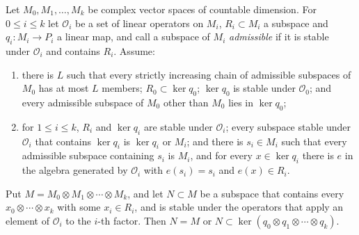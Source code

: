 \begin{lemma}\label{th-howe-tensor}
Let $M_0,M_1,\ldots,M_k$ be complex vector spaces of countable dimension. For
$0\leq i\leq k$ let $\mathcal O_i$ be a set of linear operators on $M_i$,
$R_i\subset M_i$ a subspace and $q_i\colon M_i\to P_i$ a linear map, and call
a subspace of $M_i$ \emph{admissible} if it is stable under $\mathcal O_i$ and
contains $R_i$. Assume:
\begin{enumerate}
\item[(a)] there is $L$ such that every strictly increasing chain of
  admissible subspaces of $M_0$ has at most $L$ members; $R_0\subset\ker q_0$;
  $\ker q_0$ is stable under $\mathcal O_0$; and every admissible subspace of
  $M_0$ other than $M_0$ lies in $\ker q_0$;
\item[(b)] for $1\leq i\leq k$, $R_i$ and $\ker q_i$ are stable under
  $\mathcal O_i$; every subspace stable under $\mathcal O_i$ that contains
  $\ker q_i$ is $\ker q_i$ or $M_i$; and there is $s_i\in M_i$ such that every
  admissible subspace containing $s_i$ is $M_i$, and for every
  $x\in\ker q_i$ there is $e$ in the algebra generated by $\mathcal O_i$ with
  $e(s_i)=s_i$ and $e(x)\in R_i$.
\end{enumerate}
Put $M=M_0\otimes M_1\otimes\cdots\otimes M_k$, and let $N\subset M$ be a
subspace that contains every $x_0\otimes\cdots\otimes x_k$ with some
$x_i\in R_i$, and is stable under the operators that apply an element of
$\mathcal O_i$ to the $i$-th factor. Then $N=M$ or
$N\subset\ker(q_0\otimes q_1\otimes\cdots\otimes q_k)$.
\end{lemma}
